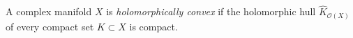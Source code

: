 
A complex manifold $X$ is \emph{holomorphically convex} if the holomorphic hull $\widehat K_{\mathcal O(X)}$ of every compact set $K\subset X$ is compact.
